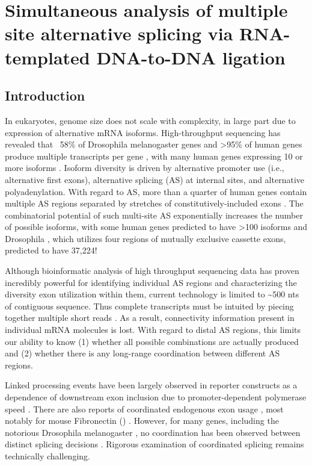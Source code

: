 \chapter{Simultaneous analysis of multiple site alternative splicing via RNA-templated DNA-to-DNA ligation} \label{SeqZipPaper} 

\section{Introduction}\label{SeqZipPaper:sec:Introduction}

	In eukaryotes, genome size does not scale with complexity, in large part due to expression of alternative mRNA isoforms. High-throughput sequencing has revealed that ~58\% of Drosophila melanogaster genes and >95\% of human genes produce multiple transcripts per gene \citep{Wang2008,Pan2008,Brown2014}, with many human genes expressing 10 or more isoforms \citep{Djebali2012}. Isoform diversity is driven by alternative promoter use (i.e., alternative first exons), alternative splicing (AS) at internal sites, and alternative polyadenylation. With regard to AS, more than a quarter of human genes contain multiple AS regions separated by stretches of constitutively-included exons \citep{Fededa2005}. The combinatorial potential of such multi-site AS exponentially increases the number of possible isoforms, with some human genes predicted to have >100 isoforms and Drosophila \dscam{}, which utilizes four regions of mutually exclusive cassette exons, predicted to have 37,224!

	Although bioinformatic analysis of high throughput sequencing data has proven incredibly powerful for identifying individual AS regions and characterizing the diversity exon utilization within them, current technology is limited to \textasciitilde 500 nts of contiguous sequence. Thus complete transcripts must be intuited by piecing together multiple short reads \citep{Boley2014,Haas2013c,Grabherr2011,Garber2011a}. As a result, connectivity information present in individual mRNA molecules is lost. With regard to distal AS regions, this limits our ability to know (1) whether all possible combinations are actually produced and (2) whether there is any long-range coordination between different AS regions.

	Linked processing events have been largely observed in reporter constructs as a dependence of downstream exon inclusion due to promoter-dependent polymerase speed \citep{Kornblihtt2013}. There are also reports of coordinated endogenous exon usage \citep{Fagnani2007}, most notably for mouse Fibronectin (\fn{}) \citep{Fededa2005}. However, for many genes, including the notorious Drosophila melanogaster \dscam{}, no coordination has been observed between distinct splicing decisions \citep{Miura2013b,Sun2013}. Rigorous examination of coordinated splicing remains technically challenging.

